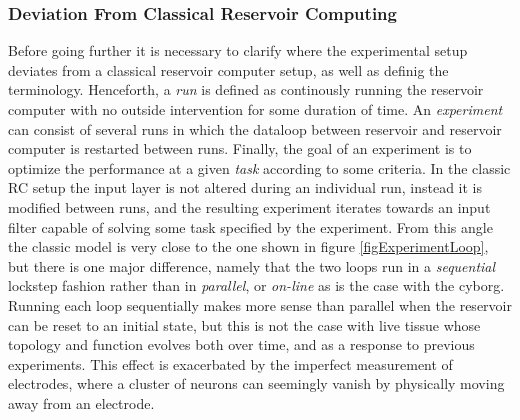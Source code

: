 \subsubsection{Deviation From Classical Reservoir Computing}
Before going further it is necessary to clarify where the experimental setup
deviates from a classical reservoir computer setup, as well as definig the
terminology.
Henceforth, a \emph{run} is defined as continously running the reservoir
computer with no outside intervention for some duration of time.
An \emph{experiment} can consist of several runs in which the dataloop between
reservoir and reservoir computer is restarted between runs. 
Finally, the goal of an experiment is to optimize the performance at a given
\emph{task} according to some criteria.
In the classic RC setup the input layer is not altered during an individual run,
instead it is modified between runs, and the resulting experiment iterates
towards an input filter capable of solving some task specified by the
experiment.
From this angle the classic model is very close to the one shown in figure
\ref{figExperimentLoop}, but there is one major difference, namely that the two
loops run in a \emph{sequential} lockstep fashion 
rather than in \emph{parallel}, or \emph{on-line} as is the case with the cyborg.
Running each loop sequentially makes more sense than parallel when the reservoir
can be reset to an initial state, but this is not 
the case with live tissue whose topology and function evolves both over time,
and as a response to previous experiments. This effect is exacerbated by the
imperfect measurement of electrodes, where a cluster of neurons can seemingly
vanish by physically moving away from an electrode.
